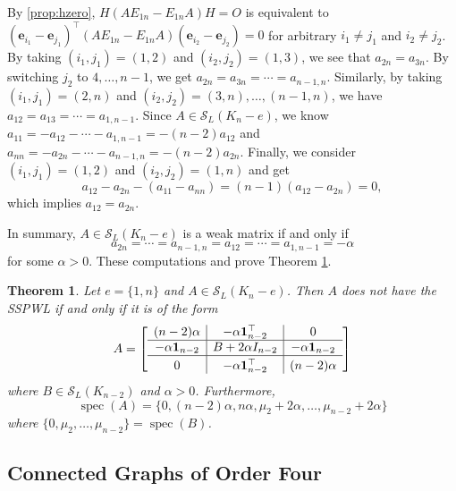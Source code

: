 \documentclass{article}
\newtheorem{theorem}{Theorem}[section]
\theoremstyle{definition}
\newcommand{\trans}{^\top}
\newcommand{\bone}{\mathbf{1}}
\newcommand{\be}{\mathbf{e}}
\newcommand{\spec}{\operatorname{spec}}
\newcommand{\mptn}{\mathcal{S}}
\begin{document}
By \cref{prop:hzero}, $H(AE_{1n} - E_{1n}A)H = O$ is equivalent to $(\be_{i_1} - \be_{j_1})\trans (AE_{1n} - E_{1n}A) (\be_{i_2} - \be_{j_2}) = 0$ for arbitrary $i_1 \neq j_1$ and $i_2 \neq j_2$.  
By taking $(i_1,j_1) = (1,2)$ and $(i_2,j_2) = (1,3)$, we see that $a_{2n} = a_{3n}$.  By switching $j_2$ to $4, \ldots, n-1$, we get $a_{2n} = a_{3n} = \cdots = a_{n-1,n}$.  Similarly, by taking $(i_1,j_1) = (2,n)$ and $(i_2,j_2) = (3,n), \ldots, (n-1,n)$, we have $a_{12} = a_{13} = \cdots = a_{1,n-1}$.  
Since $A\in\mptn_L(K_n - e)$, we know $a_{11} = -a_{12} - \cdots - a_{1,n-1} = -(n-2)a_{12}$ and $a_{nn} = -a_{2n} - \cdots - a_{n-1,n} = -(n-2)a_{2n}$.  Finally, we consider $(i_1,j_1) = (1,2)$ and $(i_2,j_2) = (1,n)$ and get 
\[
    a_{12} - a_{2n} - (a_{11} - a_{nn}) = (n-1)(a_{12} - a_{2n}) = 0,
\]
which implies $a_{12} = a_{2n}$.  

In summary, $A\in\mptn_L(K_n - e)$ is a weak matrix if and only if 
\[
    a_{2n} = \cdots = a_{n-1,n} = a_{12} = \cdots = a_{1,n-1} = -\alpha
\]
for some $\alpha > 0$. These computations and  \cite[Lemma~2.4]{IEPL} prove Theorem \ref{thm:K-e}.  

\begin{theorem}
\label{thm:K-e}
Let $e=\{1,n\}$ and $A \in \mathcal{S}_L(K_n - e)$. Then $A$ does not have the SSPWL if and only if it is of the form 
\[
A = \left[\begin{array}{c|c|c}
(n-2)\alpha & -\alpha \bone_{n-2}\trans & 0\\
\hline
-\alpha \bone_{n-2} & B + 2\alpha I_{n-2} & - \alpha \bone_{n-2}\\
\hline
 0 & - \alpha \bone_{n-2}\trans & (n-2) \alpha \rule{0pt}{2.5ex}
\end{array}
\right]
\]
where $B\in \mptn_L(K_{n-2})$ and $\alpha > 0$. Furthermore,
\begin{equation}
\label{alpha.spec}
\spec(A) = \{0, (n-2)\alpha, n \alpha, \mu_2 + 2\alpha, \dots, \mu_{n-2} +2\alpha \}
\end{equation}
where $\{0, \mu_2, \dots, \mu_{n-2}\} = \spec(B)$. 
\end{theorem}


\subsection{Connected Graphs of Order Four}
\end{document}
